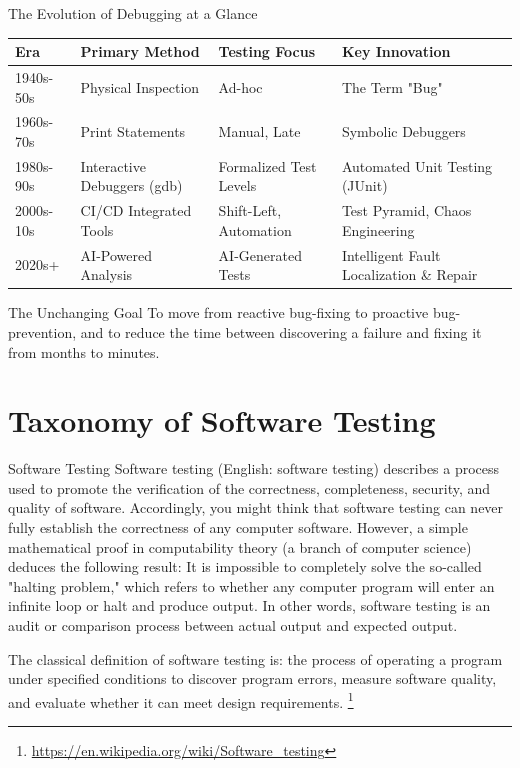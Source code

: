\documentclass{beamer}
\begin{document}
\begin{frame}[t]{The Evolution of Debugging at a Glance}
\begin{center}
    \begin{tabular}{|l|l|l|l|}
    \hline
    \textbf{Era} & \textbf{Primary Method} & \textbf{Testing Focus} & \textbf{Key Innovation} \\
    \hline
    1940s-50s   & Physical Inspection & Ad-hoc & The Term "Bug" \\
    \hline
    1960s-70s   & Print Statements & Manual, Late & Symbolic Debuggers \\
    \hline
    1980s-90s   & Interactive Debuggers (gdb) & Formalized Test Levels & Automated Unit Testing (JUnit) \\
    \hline
    2000s-10s   & CI/CD Integrated Tools & Shift-Left, Automation & Test Pyramid, Chaos Engineering \\
    \hline
    2020s+      & AI-Powered Analysis & AI-Generated Tests & Intelligent Fault Localization \& Repair \\
    \hline
    \end{tabular}
\end{center}
\vspace{1em}
\begin{block}{The Unchanging Goal}
To move from \alert{reactive} bug-fixing to \alert{proactive} bug-prevention, and to reduce the time between discovering a failure and fixing it from months to minutes.
\end{block}
\end{frame}

\section{Taxonomy of Software Testing}
\label{sec:concept}
\begin{frame}[t]{Software Testing}
Software testing (English: software testing) describes a process used to promote the verification of the correctness, completeness, security, and quality of software. Accordingly, you might think that software testing can never fully establish the correctness of any computer software. However, a simple mathematical proof in computability theory (a branch of computer science) deduces the following result: It is impossible to completely solve the so-called "halting problem," which refers to whether any computer program will enter an infinite loop or halt and produce output. In other words, software testing is an audit or comparison process between actual output and expected output.

The classical definition of software testing is: the process of operating a program under specified conditions to discover program errors, measure software quality, and evaluate whether it can meet design requirements. \footnote{\url{https://en.wikipedia.org/wiki/Software_testing}}
\end{frame}
\end{document}
